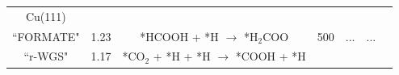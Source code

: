 \begin{table}[htbp!]
\begin{center}
{\begin{tabular}{| *{7}{c|}}
Cu(111) &&&&&& \\
 ``FORMATE"   & 1.23 & *HCOOH + *H $\rightarrow$ *H$_2$COO & 500  &... &... &\cite{zhao2011insight} \\
  ``r-WGS"     & 1.17 & *CO$_2$ + *H + *H $\rightarrow$ *COOH + *H &  & & & \\ \hline


  \end{tabular}
} 
  \end{center}
\end{table} 

